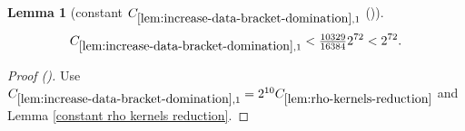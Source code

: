 \documentclass[12pt,reqno]{amsart}
\newcommand{\auto}{{({\tiny\faCar})}}
\theoremstyle{plain}
\newtheorem{lemma}[theorem]{Lemma}
\numberwithin{equation}{section}
\theoremstyle{remark}
\newcommand{\using}[1]{}
\begin{document}
\begin{lemma}[constant $C_{\ref{lem:increase-data-bracket-domination},1}$ \auto]\label{constant increase data bracket domination}\using{lem:increase-data-bracket-domination}\using{lem:rho-kernels-reduction}\using{constant rho kernels reduction}
\begin{equation}\label{constant increase data bracket domination bound}
C_{\ref{lem:increase-data-bracket-domination},1}
<\tfrac{10329}{16384}2^{72}<2^{72}.
\end{equation}
\end{lemma}
\begin{proof}[Proof \auto]
Use $C_{\ref{lem:increase-data-bracket-domination},1}=2^{10}C_{\ref{lem:rho-kernels-reduction}}$ and Lemma \ref{constant rho kernels reduction}.
\end{proof}
\end{document}
